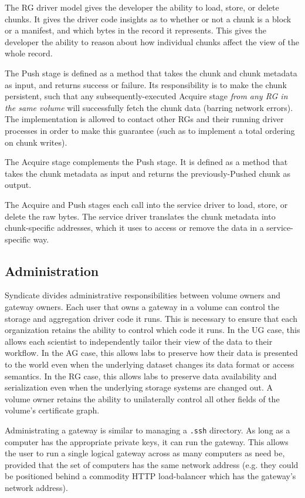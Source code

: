   The RG driver model gives the developer
the ability to load, store, or delete chunks.  It gives the driver code insights
as to whether or not a chunk is a block or a manifest, and which bytes in the
record it represents.  This gives the developer the ability to reason about how
individual chunks affect the view of the whole record.

The Push stage is defined as a method that takes the chunk and chunk metadata as
input, and returns success or failure.  Its responsibility is to make the chunk
persistent, such that any subsequently-executed Acquire stage \emph{from any
RG in the same volume} will successfully fetch the chunk data (barring network
errors).  The implementation is allowed to contact other RGs and their running
driver processes in order to make this guarantee (such as to implement a total
ordering on chunk writes).

The Acquire stage complements the Push stage.  It is defined as a method that
takes the chunk metadata as input and returns the previously-Pushed chunk as
output.

  The Acquire and Push stages each call into
the service driver to load, store, or delete the raw bytes.  The service driver
translates the chunk metadata into chunk-specific addresses, which it uses to
access or remove the data in a service-specific way.

\subsection{Administration}

Syndicate divides administrative responsibilities between volume owners and
gateway owners.  Each user that owns a gateway in a volume can control the
storage and aggregation driver code it runs.  This is necessary to ensure that
each organization retains the ability to control which code it runs.
In the UG case, this allows each
scientist to independently tailor their view of the data to their workflow.  In
the AG case, this allows labs to preserve how their data is presented to the
world even when the underlying dataset changes its data format or access
semantics.  In the RG case, this allows labs to preserve data availability and
serialization even when the underlying storage systems are changed out.
A volume owner retains the ability to unilaterally control all other fields of
the volume's certificate graph.

Administrating a gateway is similar to managing a \texttt{.ssh} directory.  As
long as a computer has the appropriate private keys, it can run the gateway.  This
allows the user to run a single logical gateway across as many computers as need
be, provided that the set of computers has the same network address (e.g. they
could be positioned behind a commodity HTTP load-balancer which has the gateway's network
address).

